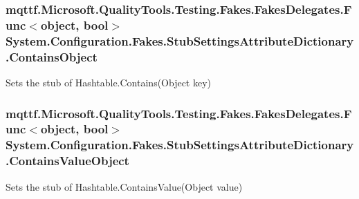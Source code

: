 \hypertarget{class_system_1_1_configuration_1_1_fakes_1_1_stub_settings_attribute_dictionary_a49cb77856f08ecd586e7362eacdd95a6}{
\subsubsection[{Contains\-Object}]{\setlength{\rightskip}{0pt plus 5cm}mqttf.\-Microsoft.\-Quality\-Tools.\-Testing.\-Fakes.\-Fakes\-Delegates.\-Func$<$object, bool$>$ System.\-Configuration.\-Fakes.\-Stub\-Settings\-Attribute\-Dictionary.\-Contains\-Object}}\label{class_system_1_1_configuration_1_1_fakes_1_1_stub_settings_attribute_dictionary_a49cb77856f08ecd586e7362eacdd95a6}


Sets the stub of Hashtable.\-Contains(\-Object key)

\hypertarget{class_system_1_1_configuration_1_1_fakes_1_1_stub_settings_attribute_dictionary_a92c5889235997c8563e797dad615835c}{
\subsubsection[{Contains\-Value\-Object}]{\setlength{\rightskip}{0pt plus 5cm}mqttf.\-Microsoft.\-Quality\-Tools.\-Testing.\-Fakes.\-Fakes\-Delegates.\-Func$<$object, bool$>$ System.\-Configuration.\-Fakes.\-Stub\-Settings\-Attribute\-Dictionary.\-Contains\-Value\-Object}}\label{class_system_1_1_configuration_1_1_fakes_1_1_stub_settings_attribute_dictionary_a92c5889235997c8563e797dad615835c}


Sets the stub of Hashtable.\-Contains\-Value(\-Object value)

